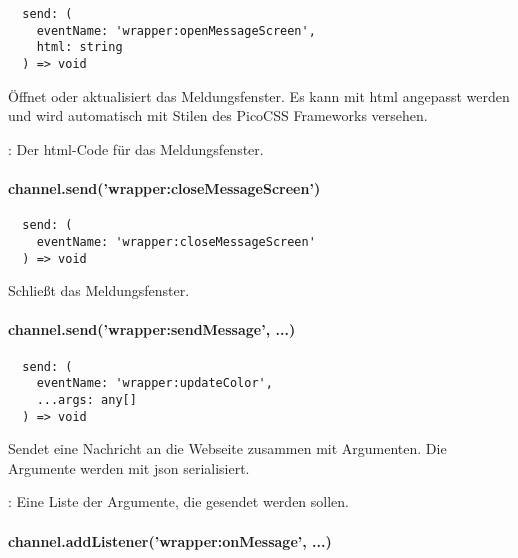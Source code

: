 \begin{verbatim}
  send: (
    eventName: 'wrapper:openMessageScreen',
    html: string
  ) => void
\end{verbatim}

Öffnet oder aktualisiert das Meldungsfenster.
Es kann mit \ac{html} angepasst werden und wird automatisch mit Stilen des PicoCSS Frameworks versehen.

\begin{arguments}
  \item {}: Der \ac{html}-Code für das Meldungsfenster.
\end{arguments}


\paragraph{channel.send('wrapper:closeMessageScreen')}

\begin{verbatim}
  send: (
    eventName: 'wrapper:closeMessageScreen'
  ) => void
\end{verbatim}

Schließt das Meldungsfenster.


\paragraph{channel.send('wrapper:sendMessage', ...)}

\begin{verbatim}
  send: (
    eventName: 'wrapper:updateColor',
    ...args: any[]
  ) => void
\end{verbatim}

Sendet eine Nachricht an die Webseite zusammen mit Argumenten.
Die Argumente werden mit \ac{json} serialisiert.

\begin{arguments}
  \item {}: Eine Liste der Argumente, die gesendet werden sollen.
\end{arguments}


\paragraph{channel.addListener('wrapper:onMessage', ...)}

